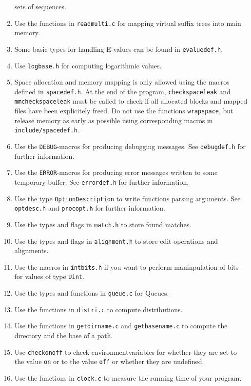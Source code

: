 \documentclass[12pt]{article}
\begin{document}
\begin{enumerate}
sets of sequences.
\item
Use the functions in \texttt{readmulti.c} for mapping virtual suffix
trees into main memory.
\item
Some basic types for handling E-values can be found in 
\texttt{evaluedef.h}.
\item
Use \texttt{logbase.h} for computing logarithmic values.
\item
Space allocation and memory mapping is only allowed using the macros
defined in \texttt{spacedef.h}. At the end of the program,
\texttt{checkspaceleak} and \texttt{mmcheckspaceleak} must be called to check
if all allocated blocks and mapped files have been explicitely freed.
Do not use the functions \texttt{wrapspace}, but release memory as
early as possible using corresponding macros in \texttt{include/spacedef.h}.
\item
Use the \texttt{DEBUG}-macros for producing debugging messages. See
\texttt{debugdef.h} for further information.
\item
Use the \texttt{ERROR}-macros for producing error messages written
to some temporary buffer. See \texttt{errordef.h} for further information. 
\item
Use the type \texttt{OptionDescription} to write functions parsing arguments.
See \texttt{optdesc.h} and \texttt{procopt.h} for further information.
\item
Use the types and flags in \texttt{match.h} to store found matches.
\item
Use the types and flags in \texttt{alignment.h} to store edit operations
and alignments.
\item
Use the macros in \texttt{intbits.h} if you want to perform maninpulation
of bits for values of type \texttt{Uint}.
\item
Use the types and functions in \texttt{queue.c} for Queues.
\item
Use the functions in \texttt{distri.c} to compute distributions.
\item
Use the functions in \texttt{getdirname.c} and \texttt{getbasename.c}
to compute the directory and the base of a path.
\item
Use \texttt{checkonoff} to check environmentvariables for whether they 
are set to the value \texttt{on} or to the value \texttt{off} or whether
they are undefined.
\item
Use the functions in \texttt{clock.c} to measure the running
time of your program.
\end{enumerate}
\end{document}
